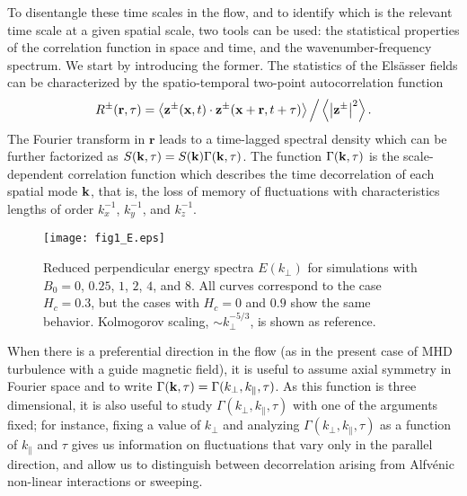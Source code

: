 \documentclass[aip,pop,reprint,amsmath,amssymb,floatfix]{revtex4-1}
\renewcommand{\vec}[1]{\mathbf{#1}}
\begin{document}
To disentangle these time scales in the flow, and to identify which is the relevant time scale at a given spatial scale, two tools can be used: the statistical properties of the correlation function in space and time, and the wavenumber-frequency spectrum. We start by introducing the former. The statistics of the Els\"asser fields can be characterized by the spatio-temporal two-point autocorrelation function \cite{servidio_time_2011}
 \begin{equation}
 R^\pm({\bf r},\tau) = \left\langle {\bf z}^\pm( {\bf x},t) \cdot
   {\bf z} ^\pm( {\bf x} + {\bf r},t+\tau) \right\rangle \Big/ 
   \left\langle \left|{{\bf z}^\pm}\right|^2 \right\rangle.
 \label{eq:Rzij}
 \end{equation}
The Fourier transform in $\vec{r}$ leads to a time-lagged spectral density which can be further factorized as $S({\bf k},\tau) = S({\bf k})\Gamma({\bf k},\tau)$. The function $\Gamma({\bf k},\tau)$ is the scale-dependent correlation function \cite{heisenberg_zur_1948, comte-bellot_simple_1971,orszag_numerical_1972} which describes the time decorrelation of each spatial mode ${\bf k}$, that is, the loss of memory of fluctuations with characteristics lengths of order $k_x^{-1}$, $k_y^{-1}$, and $k_z^{-1}$.

\begin{figure}
\centering
\texttt{[image: fig1\_E.eps]}
  \caption{Reduced perpendicular energy spectra $E(k_\perp)$ for simulations with $B_0=0$, $0.25$, $1$, $2$, $4$, and $8$. All curves correspond to the case $H_c = 0.3$, but the cases with $H_c = 0$ and $0.9$ show the same behavior. Kolmogorov scaling, $\sim k_\perp^{-5/3}$, is shown as reference.}
\label{fig1:E}
\end{figure}

When there is a preferential direction in the flow (as in the present case of MHD turbulence with a guide magnetic field), it is useful to assume axial symmetry in Fourier space and to write $\Gamma({\bf k},\tau) = \Gamma(k_\perp,k_\parallel,\tau)$. As this function is three dimensional, it is also useful to study $\Gamma(k_\perp,k_\parallel,\tau)$ with one of the arguments fixed; for instance, fixing a value of $k_\perp$ and analyzing $\Gamma(k_\perp,k_\parallel,\tau)$ as a function of $k_\parallel$ and $\tau$ gives us information on fluctuations that vary only in the parallel direction, and allow us to distinguish between decorrelation arising from Alfv\'enic non-linear interactions or sweeping.
\end{document}
